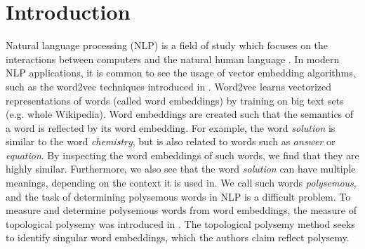 \chapter{Introduction}
\label{chap:introduction}
Natural language processing (NLP) is a field of study which focuses on the interactions between computers and the natural human language \cite{Allen2003NLP}. In modern NLP applications, it is common to see the usage of vector embedding algorithms, such as the word2vec techniques introduced in \cite{mikolov2013a}. Word2vec learns vectorized representations of words (called word embeddings) by training on big text sets (e.g. whole Wikipedia). Word embeddings are created such that the semantics of a word is reflected by its word embedding. For example, the word \textit{solution} is similar to the word \textit{chemistry}, but is also related to words such as \textit{answer} or \textit{equation}. By inspecting the word embeddings of such words, we find that they are highly similar. Furthermore, we also see that the word \textit{solution} can have multiple meanings, depending on the context it is used in. We call such words \textit{polysemous}, and the task of determining polysemous words in NLP is a difficult problem. To measure and determine polysemous words from word embeddings, the measure of topological polysemy was introduced in \cite{jakubowski2020topology}. The topological polysemy method seeks to identify singular word embeddings, which the authors claim reflect polysemy.

